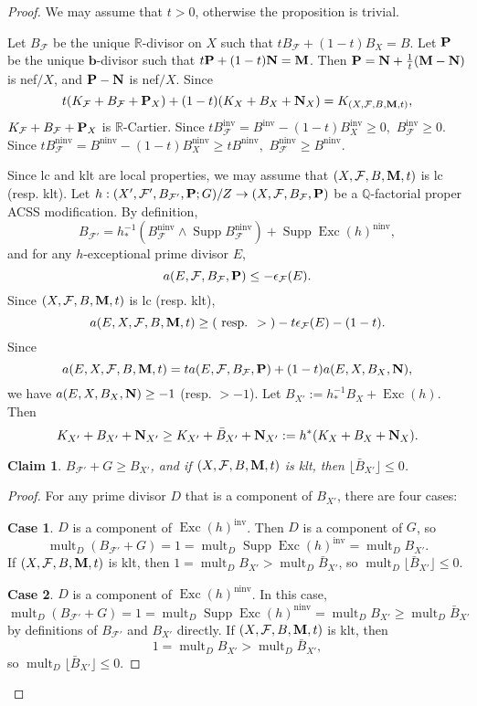\documentclass[12pt]{amsart}
\numberwithin{equation}{section}
\newcommand{\bb}{\bm{b}}
\newcommand{\Mm}{{\bf{M}}}
\newcommand{\Nn}{{\bf{N}}}
\newcommand{\Pp}{{\bf{P}}}
\newcommand{\Qq}{\mathbb{Q}}
\newcommand{\Rr}{\mathbb{R}}
\newcommand{\Exc}{\operatorname{Exc}}
\newcommand{\ninv}{\operatorname{ninv}}
\newcommand{\inv}{\operatorname{inv}}
\newcommand{\Supp}{\operatorname{Supp}}
\newcommand{\mult}{\operatorname{mult}}
\newcommand{\Ff}{\mathcal{F}}
\newtheorem{claim}[thm]{Claim}
\theoremstyle{definition}
\theoremstyle{definition}
\theoremstyle{definition}
\begin{document}
\begin{proof}
We may assume that $t>0$, otherwise the proposition is trivial. 

Let $B_{\Ff}$ be the unique $\Rr$-divisor on $X$ such that $tB_{\Ff}+(1-t)B_X=B$. Let $\Pp$ be the unique $\bb$-divisor such that $t\Pp+(1-t)\Nn=\Mm$. 
Then $\Pp=\Nn+\frac{1}{t}(\Mm-\Nn)$ is nef$/X$, and $\Pp-\Nn$ is nef$/X$. Since
$$t(K_{\Ff}+B_{\Ff}+\Pp_X)+(1-t)(K_X+B_X+\Nn_X)=K_{(X,\Ff,B,\Mm,t)},$$
$K_{\Ff}+B_{\Ff}+\Pp_X$ is $\Rr$-Cartier. Since
$tB_{\Ff}^{\inv}=B^{\inv}-(1-t)B_X^{\inv}\geq 0,$
 $B_{\Ff}^{\inv}\geq 0$. Since
$tB_{\Ff}^{\ninv}=B^{\ninv}-(1-t)B_X^{\ninv}\geq tB^{\ninv},$
$B_{\Ff}^{\ninv}\geq B^{\ninv}$. 

Since lc and klt are local properties, we may assume that $(X,\Ff,B,\Mm,t)$ is lc (resp. klt). Let $h: (X',\Ff',B_{\Ff'},\Pp;G)/Z\rightarrow (X,\Ff,B_{\Ff},\Pp)$ be a $\Qq$-factorial proper ACSS modification. By definition, 
$$B_{\Ff'}=h^{-1}_\ast (B_{\Ff}^{\ninv}\wedge\Supp B_{\Ff}^{\ninv})+\Supp\Exc(h)^{\ninv},$$
and for any $h$-exceptional prime divisor $E$, 
$$a(E,\Ff,B_{\Ff},\Pp)\leq -\epsilon_{\Ff}(E).$$ Since $(X,\Ff,B,\Mm,t)$ is lc (resp. klt), 
$$a(E,X,\Ff,B,\Mm,t)\geq\text{( resp. }>\text{)} -t\epsilon_{\Ff}(E)-(1-t).$$ 
Since
$$a(E,X,\Ff,B,\Mm,t)=ta(E,\Ff,B_{\Ff},\Pp)+(1-t)a(E,X,B_X,\Nn),$$
we have $a(E,X,B_X,\Nn)\geq -1$ (resp. $>-1$).
Let $B_{X'}:=h^{-1}_*B_X+\Exc(h)$. Then 
$$K_{X'}+B_{X'}+\Nn_{X'}\geq K_{X'}+\bar B_{X'}+\Nn_{X'}:=h^*(K_X+B_X+\Nn_X).$$
\begin{claim}
$B_{\Ff'}+G\geq B_{X'}$, and if $(X,\Ff,B,\Mm,t)$ is klt, then $\lfloor \bar B_{X'}\rfloor\leq 0$. 
\end{claim}
\begin{proof}
    For any prime divisor $D$ that is a component of $B_{X'}$, there are four cases:  

\medskip

\noindent\textbf{Case 1}. $D$ is a component of $\Exc(h)^{\inv}$. Then $D$ is a component of $G$, so
$$\mult_D(B_{\Ff'}+G)=1=\mult_D\Supp\Exc(h)^{\inv}=\mult_DB_{X'}.$$
If $(X,\Ff,B,\Mm,t)$ is klt, then $1=\mult_DB_{X'}>\mult_D\bar B_{X'}$, so $\mult_D\lfloor \bar B_{X'}\rfloor\leq 0$.


\medskip

\noindent\textbf{Case 2}. $D$ is a component of $\Exc(h)^{\ninv}$. In this case,
$$\mult_D(B_{\Ff'}+G)=1=\mult_D\Supp\Exc(h)^{\ninv}=\mult_DB_{X'}\geq\mult_D\bar B_{X'}$$
by definitions of $B_{\Ff'}$ and $B_{X'}$ directly. If $(X,\Ff,B,\Mm,t)$ is klt, then $$1=\mult_DB_{X'}>\mult_D\bar B_{X'},$$ 
so $\mult_D\lfloor \bar B_{X'}\rfloor\leq 0$.


\end{proof}
\end{proof}
\end{document}
